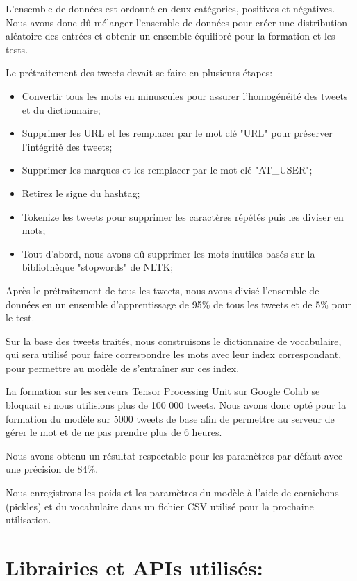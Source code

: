 L'ensemble de données est ordonné en deux catégories, positives et négatives. Nous avons donc dû mélanger l'ensemble de données pour créer une distribution aléatoire des entrées et obtenir un ensemble équilibré pour la formation et les tests.

Le prétraitement des tweets devait se faire en plusieurs étapes:
\begin{itemize}
    \item Convertir tous les mots en minuscules pour assurer l'homogénéité des tweets et du dictionnaire;
    \item Supprimer les URL et les remplacer par le mot clé "URL" pour préserver l'intégrité des tweets;
    \item Supprimer les marques \@ et les remplacer par le mot-clé "AT\_USER";
    \item Retirez le signe du hashtag;
    \item Tokenize les tweets pour supprimer les caractères répétés puis les diviser en mots;
    \item Tout d'abord, nous avons dû supprimer les mots inutiles basés sur la bibliothèque "stopwords" de NLTK;
\end{itemize}

Après le prétraitement de tous les tweets, nous avons divisé l'ensemble de données en un ensemble d'apprentissage de 95\% de tous les tweets et de 5\% pour le test.

Sur la base des tweets traités, nous construisons le dictionnaire de vocabulaire, qui sera utilisé pour faire correspondre les mots avec leur index correspondant, pour permettre au modèle de s'entraîner sur ces index.

La formation sur les serveurs Tensor Processing Unit sur Google Colab se bloquait si nous utilisions plus de 100 000 tweets. Nous avons donc opté pour la formation du modèle sur 5000 tweets de base afin de permettre au serveur de gérer le mot et de ne pas prendre plus de 6 heures.

Nous avons obtenu un résultat respectable pour les paramètres par défaut avec une précision de 84\%.

Nous enregistrons les poids et les paramètres du modèle à l'aide de cornichons (pickles) et du vocabulaire dans un fichier CSV utilisé pour la prochaine utilisation.

\section{Librairies et APIs utilisés:}
